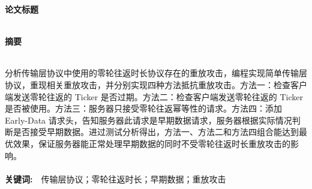 \setcounter{page}{1}
\begin{center}
  {\heiti\bfseries 论文标题}
  \\ \hspace*{\fill} \\
   \bfseries 摘\quad 要
\end{center}

  \ \\
    分析传输层协议中使用的零轮往返时长协议存在的重放攻击，编程实现简单传输层协议，重现相关重放攻击，并分别实现四种方法抵抗重放攻击。方法一：检查客户端发送零轮往返的 Ticker 是否过期。方法二：检查客户端发送零轮往返的 Ticker 是否被使用。方法三：服务器只接受零轮往返幂等性的请求。方法四：添加 Early-Data 请求头，告知服务器此请求是早期数据请求，服务器根据实际情况判断是否接受早期数据。进过测试分析得出，方法一、方法二和方法四组合能达到最优效果，保证服务器能正常处理早期数据的同时不受零轮往返时长重放攻击的影响。
    \ \\
    \ \\
  {\heiti \bfseries 关键词:}\ \ 传输层协议；零轮往返时长；早期数据；重放攻击

\newpage